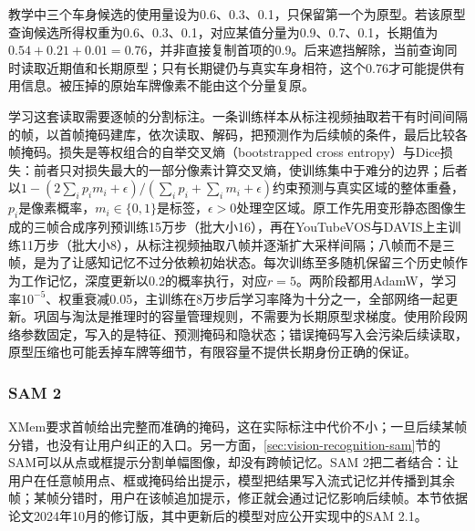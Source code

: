 教学中三个车身候选的使用量设为0.6、0.3、0.1，只保留第一个为原型。若该原型查询候选所得权重为0.6、0.3、0.1，对应某值分量为0.9、0.7、0.1，长期值为$0.54+0.21+0.01=0.76$，并非直接复制首项的0.9。后来遮挡解除，当前查询同时读取近期值和长期原型；只有长期键仍与真实车身相符，这个0.76才可能提供有用信息。被压掉的原始车牌像素不能由这个分量复原。

学习这套读取需要逐帧的分割标注。一条训练样本从标注视频抽取若干有时间间隔的帧，以首帧掩码建库，依次读取、解码，把预测作为后续帧的条件，最后比较各帧掩码。损失是等权组合的自举交叉熵（bootstrapped cross entropy）与Dice损失：前者只对损失最大的一部分像素计算交叉熵，使训练集中于难分的边界；后者以$1-(2\sum_i p_im_i+\epsilon)/(\sum_i p_i+\sum_i m_i+\epsilon)$约束预测与真实区域的整体重叠，$p_i$是像素概率，$m_i\in\{0,1\}$是标签，$\epsilon>0$处理空区域。原工作先用变形静态图像生成的三帧合成序列预训练15万步（批大小16），再在YouTubeVOS与DAVIS上主训练11万步（批大小8），从标注视频抽取八帧并逐渐扩大采样间隔；八帧而不是三帧，是为了让感知记忆不过分依赖初始状态。每次训练至多随机保留三个历史帧作为工作记忆，深度更新以0.2的概率执行，对应$r=5$。两阶段都用AdamW，学习率$10^{-5}$、权重衰减0.05，主训练在8万步后学习率降为十分之一，全部网络一起更新。巩固与淘汰是推理时的容量管理规则，不需要为长期原型求梯度。使用阶段网络参数固定，写入的是特征、预测掩码和隐状态；错误掩码写入会污染后续读取，原型压缩也可能丢掉车牌等细节，有限容量不提供长期身份正确的保证。

\subsubsection{SAM 2}
\label{sec:vision-video-sam2}

XMem要求首帧给出完整而准确的掩码，这在实际标注中代价不小；一旦后续某帧分错，也没有让用户纠正的入口。另一方面，\ref{sec:vision-recognition-sam}节的SAM可以从点或框提示分割单幅图像，却没有跨帧记忆。SAM 2把二者结合：让用户在任意帧用点、框或掩码给出提示，模型把结果写入流式记忆并传播到其余帧；某帧分错时，用户在该帧追加提示，修正就会通过记忆影响后续帧。本节依据论文2024年10月的修订版，其中更新后的模型对应公开实现中的SAM 2.1。

